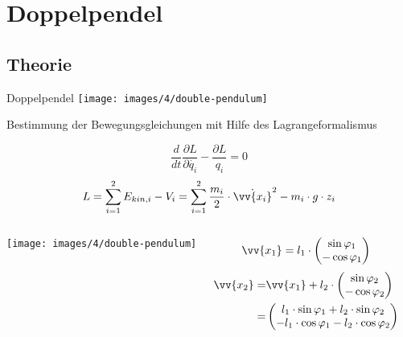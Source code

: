 \section{Doppelpendel}
\subsection{Theorie}
\begin{frame}{Doppelpendel}
	\centering
	\texttt{[image: images/4/double-pendulum]}
\end{frame}

\begin{frame}{Bestimmung der Bewegungsgleichungen mit Hilfe des Lagrangeformalismus}
	\begin{block}
		
		\begin{equation}
			\frac{d}{dt}\frac{\partial L}{\partial\dot{q_i}}-\frac{\partial L}{q_i} =0
		\label{lagrangegl}
		\end{equation}
		\begin{equation}
			 L=\sum_{i=1}^2 E_{kin,i}-V_i=\sum_{i=1}^2 \frac{m_i}{2}\cdot\dot{\vv{x_i}}^2 - m_i \cdot g \cdot z_i
		\end{equation}
	\end{block}
\end{frame}

\begin{frame}
	\begin{columns}
	\texttt{[image: images/4/double-pendulum]}
	\begin{block}{}
		\begin{equation}
			\vv{x_1}= l_1\cdot\begin{pmatrix}
			\sin \varphi_1 \\ -\cos \varphi_1
			\end{pmatrix}
		\end{equation}
		\begin{align}
			\vv{x_2}=& \vv{x_1} + l_2 \cdot \begin{pmatrix}
			\sin \varphi_2 \\ -\cos \varphi_2
			\end{pmatrix}
			\\=& \begin{pmatrix}
			l_1 \cdot \sin \varphi_1 + l_2 \cdot \sin \varphi_2 \\ - l_1 \cdot \cos \varphi_1 - l_2 \cdot \cos \varphi_2 \nonumber
			\end{pmatrix}
		\end{align}
	\end{block}
	\end{columns}
\end{frame}


